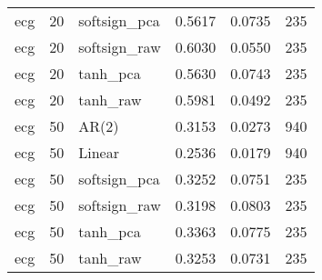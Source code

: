 \begin{table}[t]
\begin{tabular}{llllll}
ecg & 20 & softsign_pca & 0.5617 & 0.0735 & 235 \\
ecg & 20 & softsign_raw & 0.6030 & 0.0550 & 235 \\
ecg & 20 & tanh_pca & 0.5630 & 0.0743 & 235 \\
ecg & 20 & tanh_raw & 0.5981 & 0.0492 & 235 \\
ecg & 50 & AR(2) & 0.3153 & 0.0273 & 940 \\
ecg & 50 & Linear & 0.2536 & 0.0179 & 940 \\
ecg & 50 & softsign_pca & 0.3252 & 0.0751 & 235 \\
ecg & 50 & softsign_raw & 0.3198 & 0.0803 & 235 \\
ecg & 50 & tanh_pca & 0.3363 & 0.0775 & 235 \\
ecg & 50 & tanh_raw & 0.3253 & 0.0731 & 235 \\
\bottomrule
\end{tabular}
\end{table}
